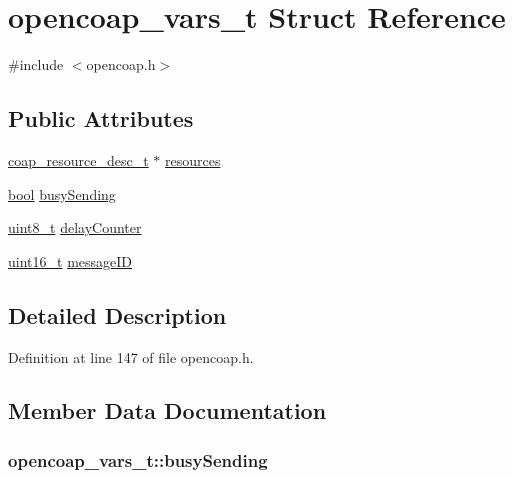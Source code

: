 \hypertarget{structopencoap__vars__t}{}\section{opencoap\+\_\+vars\+\_\+t Struct Reference}
\label{structopencoap__vars__t}


{\ttfamily \#include $<$opencoap.\+h$>$}

\subsection*{Public Attributes}
\begin{DoxyCompactItemize}
\item 
\hyperlink{structcoap__resource__desc__t}{coap\+\_\+resource\+\_\+desc\+\_\+t} $\ast$ \hyperlink{structopencoap__vars__t_a63b73eebe78007a9d6bb1e018ed8db45}{resources}
\item 
\hyperlink{_p_e___types_8h_a97a80ca1602ebf2303258971a2c938e2}{bool} \hyperlink{structopencoap__vars__t_adad54f7abb9d4fe4544b0a065bc43296}{busy\+Sending}
\item 
\hyperlink{_p_e___types_8h_aba7bc1797add20fe3efdf37ced1182c5}{uint8\+\_\+t} \hyperlink{structopencoap__vars__t_a33a838538c67ff1818a7200bd7eb4479}{delay\+Counter}
\item 
\hyperlink{_p_e___types_8h_a1f1825b69244eb3ad2c7165ddc99c956}{uint16\+\_\+t} \hyperlink{structopencoap__vars__t_a3328024f36ae1211d6f28386b6b662b2}{message\+ID}
\end{DoxyCompactItemize}


\subsection{Detailed Description}


Definition at line 147 of file opencoap.\+h.



\subsection{Member Data Documentation}
\subsubsection[{\texorpdfstring{busy\+Sending}{busySending}}]{ opencoap\+\_\+vars\+\_\+t\+::busy\+Sending}\hypertarget{structopencoap__vars__t_adad54f7abb9d4fe4544b0a065bc43296}{}\label{structopencoap__vars__t_adad54f7abb9d4fe4544b0a065bc43296}


